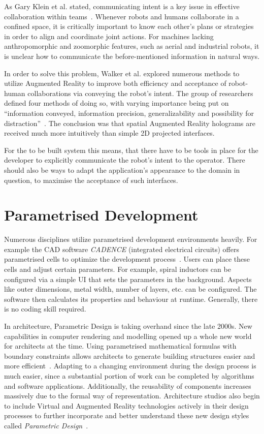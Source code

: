 As Gary Klein et al. stated, communicating intent is a key issue in effective collaboration within teams~\cite{klein2005common}. Whenever robots and humans collaborate in a confined space, it is critically important to know each other’s plans or strategies in order to align and coordinate joint actions. For machines lacking anthropomorphic and zoomorphic features, such as aerial and industrial robots, it is unclear how to communicate the before-mentioned information in natural ways.

In order to solve this problem, Walker et al. \cite{walker2018communicating} explored numerous methods to utilize Augmented Reality to improve both efficiency and acceptance of robot-human collaborations via conveying the robot's intent. The group of researchers defined four methods of doing so, with varying importance being put on “information conveyed, information precision, generalizability and possibility for distraction”~\cite{walker2018communicating}. The conclusion was that spatial Augmented Reality holograms are received much more intuitively than simple 2D projected interfaces.

For the to be built system this means, that there have to be tools in place for the developer to explicitly communicate the robot's intent to the operator. There should also be ways to adapt the application's appearance to the domain in question, to maximise the acceptance of such interfaces.

\section{Parametrised Development}\label{Section:ParametricDesignIntoduction}
Numerous disciplines utilize parametrised development environments heavily. For example the CAD software \textit{CADENCE} (integrated electrical circuits) offers parametrised cells to optimize the development process~\cite{parametrizedCellElectricalInductor}. Users can place these cells and adjust certain parameters. For example, spiral inductors can be configured via a simple UI that sets the parameters in the background. Aspects like outer dimensions, metal width, number of layers, etc. can be configured. The software then calculates its properties and behaviour at runtime. Generally, there is no coding skill required.

In architecture, Parametric Design is taking overhand since the late 2000s. New capabilities in computer rendering and modelling opened up a whole new world for architects at the time. Using parametrised mathematical formulas with boundary constraints allows architects to generate building structures easier and more efficient~\cite{stavric2011parametric}. Adapting to a changing environment during the design process is much easier, since a substantial portion of work can be completed by algorithms and software applications. Additionally, the reusability of components increases massively due to the formal way of representation. Architecture studios also begin to include Virtual and Augmented Reality technologies actively in their design processes to further incorporate and better understand these new design styles called \textit{Parametric Design}~\cite{seichterDigitalDesignArch, salimSystemArchMR, wangFrameworkMXBIM}. 


